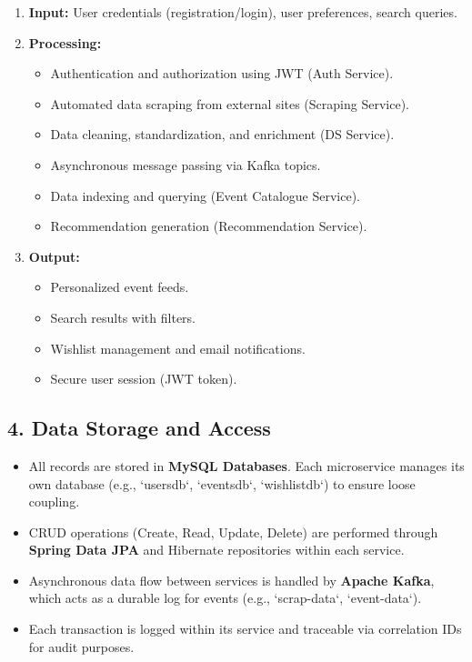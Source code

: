\documentclass[12pt,a4paper]{report}
\begin{document}
\begin{enumerate}
    \item \textbf{Input:} User credentials (registration/login), user preferences, search queries.
    \item \textbf{Processing:}
          \begin{itemize}
              \item Authentication and authorization using JWT (Auth Service).
              \item Automated data scraping from external sites (Scraping Service).
              \item Data cleaning, standardization, and enrichment (DS Service).
              \item Asynchronous message passing via Kafka topics.
              \item Data indexing and querying (Event Catalogue Service).
              \item Recommendation generation (Recommendation Service).
          \end{itemize}
    \item \textbf{Output:}
          \begin{itemize}
              \item Personalized event feeds.
              \item Search results with filters.
              \item Wishlist management and email notifications.
              \item Secure user session (JWT token).
          \end{itemize}
\end{enumerate}

\subsection*{4. Data Storage and Access}

\begin{itemize}
    \item All records are stored in \textbf{MySQL Databases}. Each microservice manages its own database (e.g., `usersdb`, `eventsdb`, `wishlistdb`) to ensure loose coupling.
    \item CRUD operations (Create, Read, Update, Delete) are performed through \textbf{Spring Data JPA} and Hibernate repositories within each service.
    \item Asynchronous data flow between services is handled by \textbf{Apache Kafka}, which acts as a durable log for events (e.g., `scrap-data`, `event-data`).
    \item Each transaction is logged within its service and traceable via correlation IDs for audit purposes.
\end{itemize}
\end{document}
